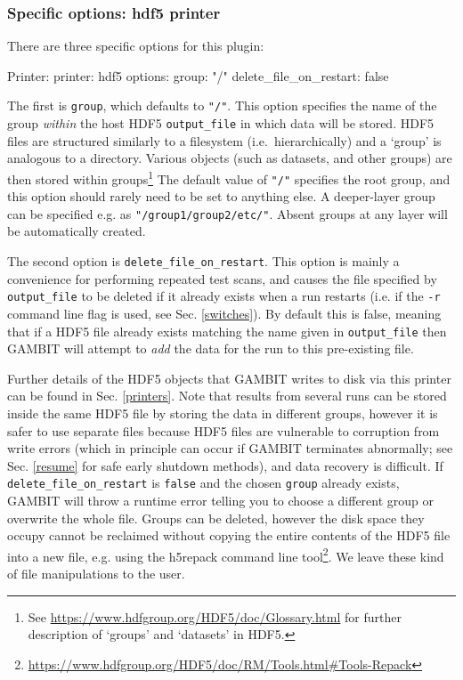 \documentclass[pdftex,twocolumn,epjc3_preprint,runningheads]{svjour3}
\renewcommand{\_}{\discretionary{\underscore}{}{\underscore}}
\newcommand\yaml[1]{{\lstset{style=yaml}\lstinline!#1!\lstset{style=cpp}}}
\newcommand\term[1]{{\lstset{style=terminal}\lstinline!#1!\lstset{style=cpp}}}
\newcommand{\gambit}{\textsf{GAMBIT}\xspace}
\newcommand{\GB}{\gambit}
\begin{document}
\subsubsection{Specific options: \textsf{hdf5} printer}
\label{hdf5_printer_setup}
There are three specific options for this plugin:
\begin{lstyaml}
Printer:
  printer: hdf5
  options:
    group: "/"
    delete_file_on_restart: false
\end{lstyaml}
The first is \yaml{group}, which defaults to \yaml{"/"}. This option specifies the name of the group \emph{within} the host \textsf{HDF5} \yaml{output_file} in which data will be stored. \textsf{HDF5} files are structured similarly to a filesystem (i.e.\ hierarchically) and a `group' is analogous to a directory. Various objects (such as datasets, and other groups) are then stored within groups\footnote{See \href{https://www.hdfgroup.org/HDF5/doc/Glossary.html}{https://www.hdfgroup.org/HDF5/doc/Glossary.html} for further description of `groups' and `datasets' in \textsf{HDF5}.} The default value of \yaml{"/"} specifies the root group, and this option should rarely need to be set to anything else. A deeper-layer group can be specified e.g. as \yaml{"/group1/group2/etc/"}. Absent groups at any layer will be automatically created.

The second option is \yaml{delete_file_on_restart}. This option is mainly a convenience for performing repeated test scans, and causes the file specified by \yaml{output_file} to be deleted if it already exists when a run restarts (i.e. if the \term{-r} command line flag is used, see Sec. \ref{switches}). By default this is false, meaning that if a \textsf{HDF5} file already exists matching the name given in \yaml{output_file} then \GB will attempt to \emph{add} the data for the run to this pre-existing file.

Further details of the \textsf{HDF5} objects that \GB writes to disk via this printer can be found in Sec. \ref{printers}. Note that results from several runs can be stored inside the same \textsf{HDF5} file by storing the data in different groups, however it is safer to use separate files because \textsf{HDF5} files are vulnerable to corruption from write errors (which in principle can occur if \GB terminates abnormally; see Sec. \ref{resume} for safe early shutdown methods), and data recovery is difficult. If \yaml{delete_file_on_restart} is \yaml{false} and the chosen \yaml{group} already exists, \GB will throw a runtime error telling you to choose a different group or overwrite the whole file. Groups can be deleted, however the disk space they occupy cannot be reclaimed without copying the entire contents of the \textsf{HDF5} file into a new file, e.g. using the \textsf{h5repack} command line tool\footnote{\href{https://www.hdfgroup.org/HDF5/doc/RM/Tools.html\#Tools-Repack}{https://www.hdfgroup.org/HDF5/doc/RM/Tools.html\#Tools-Repack}}. We leave these kind of file manipulations to the user.
\end{document}
